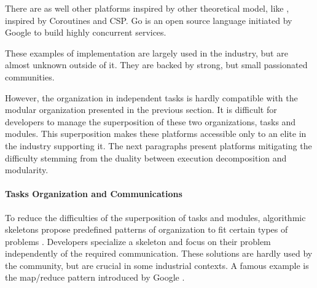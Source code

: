 There are as well other platforms inspired by other theoretical model, like , inspired by Coroutines and CSP.
Go is an open source language initiated by Google to build highly concurrent services.

These examples of implementation are largely used in the industry, but are almost unknown outside of it.
They are backed by strong, but small passionated communities.

However, the organization in independent tasks is hardly compatible with the modular organization presented in the previous section.
It is difficult for developers to manage the superposition of these two organizations, tasks and modules.
This superposition makes these platforms accessible only to an elite in the industry supporting it.
The next paragraphs present platforms mitigating the difficulty stemming from the duality between execution decomposition and modularity.

\paragraph{Tasks Organization and Communications}

To reduce the difficulties of the superposition of tasks and modules, algorithmic skeletons propose predefined patterns of organization to fit certain types of problems \cite{Cole1988, Dean2008, McCool2010, Gonzalez-Velez2010}.
Developers specialize a skeleton and focus on their problem independently of the required communication.
These solutions are hardly used by the community, but are crucial in some industrial contexts.
A famous example is the map/reduce pattern introduced by Google \cite{Dean2008}.



